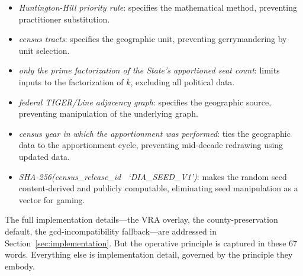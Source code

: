\begin{itemize}
  \item \textit{Huntington-Hill priority rule}: specifies the mathematical
    method, preventing practitioner substitution.
  \item \textit{census tracts}: specifies the geographic unit, preventing
    gerrymandering by unit selection.
  \item \textit{only the prime factorization of the State's apportioned
    seat count}: limits inputs to the factorization of $k$, excluding
    all political data.
  \item \textit{federal TIGER/Line adjacency graph}: specifies the
    geographic source, preventing manipulation of the underlying graph.
  \item \textit{census year in which the apportionment was performed}:
    ties the geographic data to the apportionment cycle, preventing
    mid-decade redrawing using updated data.
  \item \textit{SHA-256(census\_release\_id \textbar\textbar\
    `DIA\_SEED\_V1')}: makes the random seed content-derived and publicly
    computable, eliminating seed manipulation as a vector for gaming.
\end{itemize}

The full implementation details---the VRA overlay, the county-preservation
default, the gcd-incompatibility fallback---are addressed in
Section~\ref{sec:implementation}.
But the operative principle is captured in these 67 words.
Everything else is implementation detail, governed by the principle they embody.
